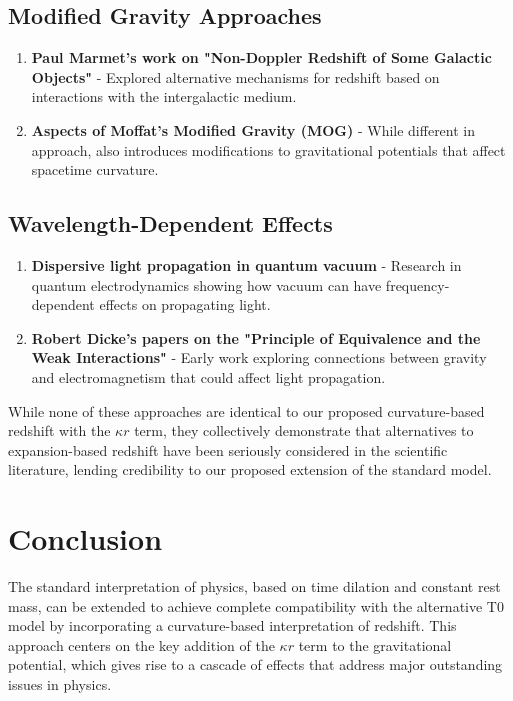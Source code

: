 \documentclass[12pt,a4paper]{article}
\begin{document}
	\subsection{Modified Gravity Approaches}
	
	\begin{enumerate}
		\item \textbf{Paul Marmet's work on "Non-Doppler Redshift of Some Galactic Objects"} - Explored alternative mechanisms for redshift based on interactions with the intergalactic medium.
		
		\item \textbf{Aspects of Moffat's Modified Gravity (MOG)} - While different in approach, also introduces modifications to gravitational potentials that affect spacetime curvature.
	\end{enumerate}
	
	\subsection{Wavelength-Dependent Effects}
	
	\begin{enumerate}
		\item \textbf{Dispersive light propagation in quantum vacuum} - Research in quantum electrodynamics showing how vacuum can have frequency-dependent effects on propagating light.
		
		\item \textbf{Robert Dicke's papers on the "Principle of Equivalence and the Weak Interactions"} - Early work exploring connections between gravity and electromagnetism that could affect light propagation.
	\end{enumerate}
	
	While none of these approaches are identical to our proposed curvature-based redshift with the $\kappa r$ term, they collectively demonstrate that alternatives to expansion-based redshift have been seriously considered in the scientific literature, lending credibility to our proposed extension of the standard model.
	
	\section{Conclusion}
	
	The standard interpretation of physics, based on time dilation and constant rest mass, can be extended to achieve complete compatibility with the alternative T0 model by incorporating a curvature-based interpretation of redshift. This approach centers on the key addition of the $\kappa r$ term to the gravitational potential, which gives rise to a cascade of effects that address major outstanding issues in physics.
	
\end{document}
